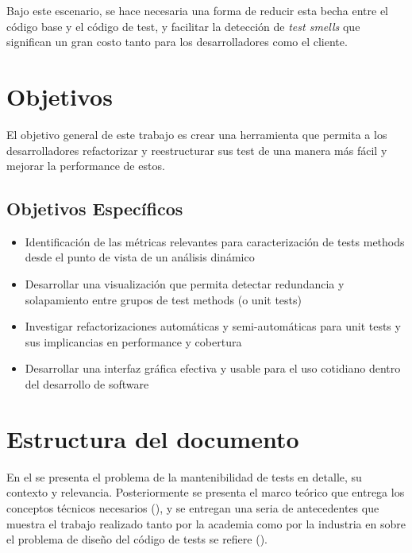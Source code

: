\par Bajo este escenario, se hace necesaria una forma de reducir esta becha entre el código base y el código de test, y facilitar la detección de \emph{test smells} que significan un gran costo tanto para los desarrolladores como el cliente.



\section{Objetivos}
\par El objetivo general de este trabajo es crear una herramienta que permita a los desarrolladores refactorizar y reestructurar sus test de una manera más fácil y mejorar la performance de estos.

\subsection*{Objetivos Específicos}
\begin{itemize}
\item Identificación de las métricas relevantes para caracterización de tests methods desde el punto de vista de un análisis dinámico
\item Desarrollar una visualización que permita detectar redundancia y solapamiento entre grupos de test methods (o unit tests)
\item Investigar refactorizaciones automáticas y semi-automáticas para unit tests y sus implicancias en performance y cobertura
\item Desarrollar una interfaz gráfica efectiva y usable para el uso cotidiano dentro del desarrollo de software
\end{itemize}

\section{Estructura del documento}

\par En el  se presenta el problema de la mantenibilidad de tests en detalle, su contexto y relevancia. Posteriormente se presenta el marco teórico que entrega los conceptos técnicos necesarios (), y se entregan una seria de antecedentes que muestra el trabajo realizado tanto por la academia como por la industria en sobre el problema de diseño del código de tests se refiere (). 

